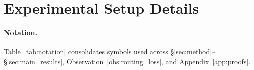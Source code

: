 \documentclass{article}
\begin{document}
\newpage
\appendix
\renewcommand{\thetable}{\Alph{section}.\arabic{table}}
\renewcommand{\thefigure}{\Alph{section}.\arabic{figure}}
\makeatletter
{}
\makeatother
\setcounter{table}{0}
\setcounter{figure}{0}


\section{Experimental Setup Details}
\label{app:setup}

\paragraph{Notation.} Table~\ref{tab:notation} consolidates symbols used across \S\ref{sec:method}--\S\ref{sec:main_results}, Observation~\ref{obs:routing_loss}, and Appendix~\ref{app:proofs}.
\end{document}
